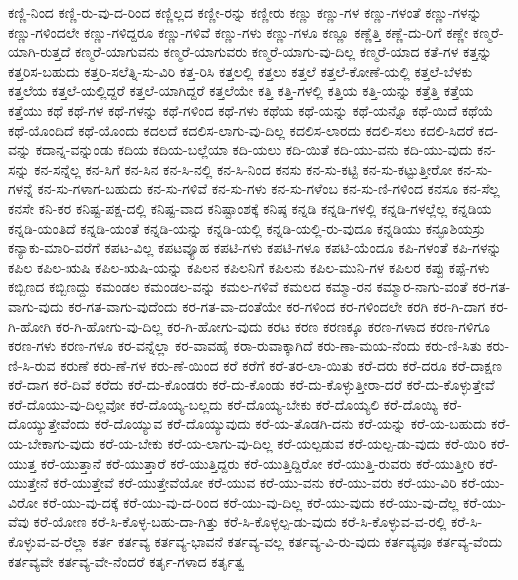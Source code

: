 {ಕಣ್ಣಿ-ನಿಂದ
ಕಣ್ಣಿ-ರು-ವು-ದ-ರಿಂದ
ಕಣ್ಣಿಲ್ಲದ
ಕಣ್ಣೀ-ರನ್ನು
ಕಣ್ಣೀರು
ಕಣ್ಣು
ಕಣ್ಣು-ಗಳ
ಕಣ್ಣು-ಗಳಂತೆ
ಕಣ್ಣು-ಗಳನ್ನು
ಕಣ್ಣು-ಗಳಿಂದಲೇ
ಕಣ್ಣು-ಗಳಿದ್ದರೂ
ಕಣ್ಣು-ಗಳಿವೆ
ಕಣ್ಣು-ಗಳು
ಕಣ್ಣು-ಗಳೂ
ಕಣ್ಣೂ
ಕಣ್ಣೆತ್ತಿ
ಕಣ್ಣೆ-ದು-ರಿಗೆ
ಕಣ್ಣೇ
ಕಣ್ಮರೆ-ಯಾಗಿ-ರುತ್ತದೆ
ಕಣ್ಮರೆ-ಯಾಗುವನು
ಕಣ್ಮರೆ-ಯಾಗುವರು
ಕಣ್ಮರೆ-ಯಾಗು-ವು-ದಿಲ್ಲ
ಕಣ್ಮರೆ-ಯಾದ
ಕತೆ-ಗಳ
ಕತ್ತನ್ನು
ಕತ್ತರಿಸ-ಬಹುದು
ಕತ್ತರಿ-ಸಲೆತ್ನಿ-ಸು-ವಿರಿ
ಕತ್ತ-ರಿಸಿ
ಕತ್ತಲಲ್ಲಿ
ಕತ್ತಲು
ಕತ್ತಲೆ
ಕತ್ತಲೆ-ಕೋಣೆ-ಯಲ್ಲಿ
ಕತ್ತಲೆ-ಬೆಳಕು
ಕತ್ತಲೆಯ
ಕತ್ತಲೆ-ಯಲ್ಲಿದ್ದರೆ
ಕತ್ತಲೆ-ಯಾಗಿದ್ದರೆ
ಕತ್ತಲೆಯೇ
ಕತ್ತಿ
ಕತ್ತಿ-ಗಳಲ್ಲಿ
ಕತ್ತಿಯ
ಕತ್ತಿ-ಯನ್ನು
ಕತ್ತೆತ್ತಿ
ಕತ್ತೆಯ
ಕತ್ತೆಯು
ಕಥೆ
ಕಥೆ-ಗಳ
ಕಥೆ-ಗಳನ್ನು
ಕಥೆ-ಗಳಿಂದ
ಕಥೆ-ಗಳು
ಕಥೆಯ
ಕಥೆ-ಯನ್ನು
ಕಥೆ-ಯನ್ನೊ
ಕಥೆ-ಯಿದೆ
ಕಥೆಯೆ
ಕಥೆ-ಯೊಂದಿದೆ
ಕಥೆ-ಯೊಂದು
ಕದಲದೆ
ಕದಲಿಸ-ಲಾಗು-ವು-ದಿಲ್ಲ
ಕದಲಿಸ-ಲಾರದು
ಕದಲಿ-ಸಲು
ಕದಲಿ-ಸಿದರೆ
ಕದ-ವನ್ನು
ಕದಾನ್ನ-ವನ್ನುಂಡು
ಕದಿಯ
ಕದಿಯ-ಬಲ್ಲೆಯಾ
ಕದಿ-ಯಲು
ಕದಿ-ಯಿತೆ
ಕದಿ-ಯು-ವನು
ಕದಿ-ಯು-ವುದು
ಕನ-ಸನ್ನು
ಕನ-ಸನ್ನೆಲ್ಲ
ಕನ-ಸಿಗೆ
ಕನ-ಸಿನ
ಕನ-ಸಿ-ನಲ್ಲಿ
ಕನ-ಸಿ-ನಿಂದ
ಕನಸು
ಕನ-ಸು-ಕಟ್ಟಿ
ಕನ-ಸು-ಕಟ್ಟುತ್ತೀರೋ
ಕನ-ಸು-ಗಳನ್ನೆ
ಕನ-ಸು-ಗಳಾಗ-ಬಹುದು
ಕನ-ಸು-ಗಳಿವೆ
ಕನ-ಸು-ಗಳು
ಕನ-ಸು-ಗಳೆಂಬ
ಕನ-ಸು-ಣಿ-ಗಳಿಂದ
ಕನಸೂ
ಕನ-ಸೆಲ್ಲ
ಕನಸೇ
ಕನಿ-ಕರ
ಕನಿಷ್ಟ-ಪಕ್ಷ-ದಲ್ಲಿ
ಕನಿಷ್ಟ-ವಾದ
ಕನಿಷ್ಟಾಂಶಕ್ಕೆ
ಕನಿಷ್ಠ
ಕನ್ನಡಿ
ಕನ್ನಡಿ-ಗಳಲ್ಲಿ
ಕನ್ನಡಿ-ಗಳಲ್ಲೆಲ್ಲ
ಕನ್ನಡಿಯ
ಕನ್ನಡಿ-ಯಂತಿದೆ
ಕನ್ನಡಿ-ಯಂತೆ
ಕನ್ನಡಿ-ಯನ್ನು
ಕನ್ನಡಿ-ಯಲ್ಲಿ
ಕನ್ನಡಿ-ಯಲ್ಲಿ-ರು-ವುದೂ
ಕನ್ನಡಿಯು
ಕನ್ಫೂಶಿಯಸ್ರು
ಕನ್ಯಾಕು-ಮಾರಿ-ವರೆಗೆ
ಕಪಟ-ವಿಲ್ಲ
ಕಪಟವ್ಯೂಹ
ಕಪಟಿ-ಗಳು
ಕಪಟಿ-ಗಳೂ
ಕಪಟಿ-ಯೆಂದೂ
ಕಪಿ-ಗಳಂತೆ
ಕಪಿ-ಗಳನ್ನು
ಕಪಿಲ
ಕಪಿಲ-ಋಷಿ
ಕಪಿಲ-ಋಷಿ-ಯನ್ನು
ಕಪಿಲನ
ಕಪಿಲನಿಗೆ
ಕಪಿಲನು
ಕಪಿಲ-ಮುನಿ-ಗಳ
ಕಪಿಲರ
ಕಪ್ಪು
ಕಪ್ಪೆ-ಗಳು
ಕಬ್ಬಿಣದ
ಕಬ್ಬಿಣದ್ದು
ಕಮಂಡಲ
ಕಮಂಡಲ-ವನ್ನು
ಕಮಲ-ಗಳಿವೆ
ಕಮಲದ
ಕಮ್ಮಾ-ರನ
ಕಮ್ಮಾರ-ನಾಗು-ವಂತೆ
ಕರ-ಗತ-ವಾಗು-ವುದು
ಕರ-ಗತ-ವಾಗು-ವುದೆಂದು
ಕರ-ಗತ-ವಾ-ದಂತೆಯೇ
ಕರ-ಗಳಿಂದ
ಕರ-ಗಳಿಂದಲೇ
ಕರಗಿ
ಕರ-ಗಿ-ದಾಗ
ಕರ-ಗಿ-ಹೋಗಿ
ಕರ-ಗಿ-ಹೋಗು-ವು-ದಿಲ್ಲ
ಕರ-ಗಿ-ಹೋಗು-ವುದು
ಕರಟ
ಕರಣ
ಕರಣಕ್ಕೂ
ಕರಣ-ಗಳಾದ
ಕರಣ-ಗಳಿಗೂ
ಕರಣ-ಗಳು
ಕರಣ-ಗಳೂ
ಕರ-ವನ್ನೆಲ್ಲಾ
ಕರ-ವಾವಹೈ
ಕರಾ-ರುವಾಕ್ಕಾಗಿದೆ
ಕರು-ಣಾ-ಮಯ-ನೆಂದು
ಕರು-ಣಿ-ಸಿತು
ಕರು-ಣಿ-ಸಿ-ರುವ
ಕರುಣೆ
ಕರು-ಣೆ-ಗಳ
ಕರು-ಣೆ-ಯಿಂದ
ಕರೆ
ಕರೆಗೆ
ಕರೆ-ತರ-ಲಾ-ಯಿತು
ಕರೆ-ದರು
ಕರೆ-ದರೂ
ಕರೆ-ದಾಕ್ಷಣ
ಕರೆ-ದಾಗ
ಕರೆ-ದಿವೆ
ಕರೆದು
ಕರೆ-ದು-ಕೊಂಡರು
ಕರೆ-ದು-ಕೊಂಡು
ಕರೆ-ದು-ಕೊಳ್ಳುತ್ತೀರಾ-ದರೆ
ಕರೆ-ದು-ಕೊಳ್ಳುತ್ತೇವೆ
ಕರೆ-ದೊಯು-ವು-ದಿಲ್ಲವೋ
ಕರೆ-ದೊಯ್ಯ-ಬಲ್ಲದು
ಕರೆ-ದೊಯ್ಯ-ಬೇಕು
ಕರೆ-ದೊಯ್ಯಲಿ
ಕರೆ-ದೊಯ್ಯಿ
ಕರೆ-ದೊಯ್ಯುತ್ತೇವೆಂದು
ಕರೆ-ದೊಯ್ಯುವ
ಕರೆ-ದೊಯ್ಯುವುದು
ಕರೆ-ಯ-ತೊಡಗಿ-ದನು
ಕರೆ-ಯನ್ನು
ಕರೆ-ಯ-ಬಹುದು
ಕರೆ-ಯ-ಬೇಕಾಗು-ವುದು
ಕರೆ-ಯ-ಬೇಕು
ಕರೆ-ಯ-ಲಾಗು-ವು-ದಿಲ್ಲ
ಕರೆ-ಯಲ್ಪಡುವ
ಕರೆ-ಯಲ್ಪ-ಡು-ವುದು
ಕರೆ-ಯಿರಿ
ಕರೆ-ಯುತ್ತ
ಕರೆ-ಯುತ್ತಾನೆ
ಕರೆ-ಯುತ್ತಾರೆ
ಕರೆ-ಯುತ್ತಿದ್ದರು
ಕರೆ-ಯುತ್ತಿದ್ದಿರೋ
ಕರೆ-ಯುತ್ತಿ-ರುವರು
ಕರೆ-ಯುತ್ತೀರಿ
ಕರೆ-ಯುತ್ತೇನೆ
ಕರೆ-ಯುತ್ತೇವೆ
ಕರೆ-ಯುತ್ತೇವೆಯೋ
ಕರೆ-ಯುವ
ಕರೆ-ಯು-ವನು
ಕರೆ-ಯು-ವರು
ಕರೆ-ಯು-ವಿರಿ
ಕರೆ-ಯು-ವಿರೋ
ಕರೆ-ಯು-ವು-ದಕ್ಕೆ
ಕರೆ-ಯು-ವು-ದ-ರಿಂದ
ಕರೆ-ಯು-ವು-ದಿಲ್ಲ
ಕರೆ-ಯು-ವುದು
ಕರೆ-ಯು-ವು-ದೆಲ್ಲ
ಕರೆ-ಯು-ವೆವು
ಕರೆ-ಯೋಣ
ಕರೆ-ಸಿ-ಕೊಳ್ಳ-ಬಹು-ದಾ-ಗಿತ್ತು
ಕರೆ-ಸಿ-ಕೊಳ್ಳಲ್ಪ-ಡು-ವುದು
ಕರೆ-ಸಿ-ಕೊಳ್ಳುವ-ವ-ರಲ್ಲಿ
ಕರೆ-ಸಿ-ಕೊಳ್ಳುವ-ವ-ರೆಲ್ಲಾ
ಕರ್ತ
ಕರ್ತವ್ಯ
ಕರ್ತವ್ಯ-ಭಾವನೆ
ಕರ್ತವ್ಯ-ವಲ್ಲ
ಕರ್ತವ್ಯ-ವಿ-ರು-ವುದು
ಕರ್ತವ್ಯವೂ
ಕರ್ತವ್ಯ-ವೆಂದು
ಕರ್ತವ್ಯವೇ
ಕರ್ತವ್ಯ-ವೇ-ನೆಂದರೆ
ಕರ್ತೃ-ಗಳಾದ
ಕರ್ತೃತ್ವ
}
